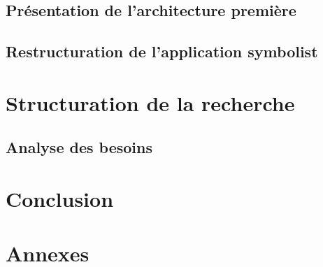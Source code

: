 \documentclass[utf8,final]{stageM2R} %
\begin{document}
	\section{Présentation de l'architecture première}
	\label{sec:architecturePremiere}
	

	\section{Restructuration de l'application symbolist}
	\label{sec:restructurationSymbolist}
	
	
\chapter{Structuration de la recherche}
\label{chap:structurationRecherche}

	\section{Analyse des besoins}
	\label{sec:analyseBesoins}
	

	
\clearpage
\chapter{Conclusion}


\printbibliography

\listoffigures

\printglossary

\appendix
\chapter{Annexes}

\end{document}
